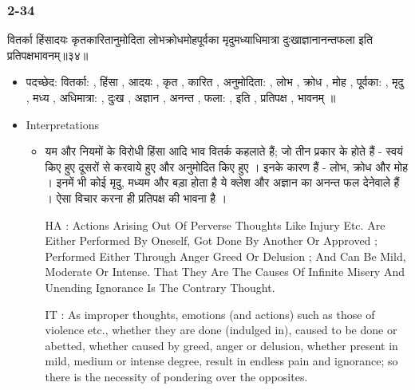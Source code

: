 \begin{frame}[fragile]\frametitle{2-34}
\begin{sanskrit}
वितर्का हिंसादयः कृतकारितानुमोदिता लोभक्रोधमोहपूर्वका मृदुमध्याधिमात्रा दुःखाज्ञानानन्तफला इति प्रतिपक्षभावनम्॥३४॥
\end{sanskrit}

	\begin{itemize}
	\item पदच्छेद: वितर्का: , हिंसा , आदयः , कृत , कारित , अनुमोदिता: , लोभ , क्रोध , मोह , पूर्वका: , मृदु , मध्य , अधिमात्रा: , दुःख , अज्ञान , अनन्त , फला: , इति , प्रतिपक्ष , भावनम् ॥
	\item Interpretations
		\begin{itemize}
		\item यम और नियमों के विरोधी हिंसा आदि भाव वितर्क कहलाते हैं; जो तीन प्रकार के होते हैं - स्वयं किए हुए दूसरों से करवाये हुए और अनुमोदित किए हुए । इनके कारण हैं - लोभ, क्रोध और मोह । इनमें भी कोई मृदु, मध्यम और बड़ा होता है ये क्लेश और अज्ञान का अनन्त फल देनेवाले हैं । ऐसा विचार करना ही प्रतिपक्ष की भावना है ।
		\item [HA]: Actions Arising Out Of Perverse Thoughts Like Injury Etc. Are Either Performed By Oneself, Got Done By Another Or Approved ; Performed Either Through Anger Greed Or Delusion ; And Can Be Mild, Moderate Or Intense. That They Are The Causes Of Infinite Misery And Unending Ignorance Is The Contrary Thought.
		\item [IT]: As improper thoughts, emotions (and actions) such as those of violence etc., whether they are done (indulged in), caused to be done or abetted, whether caused by greed, anger or delusion, whether present in mild, medium or intense degree, result in endless pain and ignorance; so there is the necessity of pondering over the opposites.		
		\end{itemize}
	\end{itemize}	
\end{frame}


